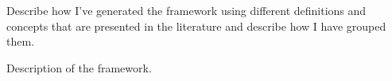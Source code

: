 \begin{table}[htbp]
\begin{tabular}{|p{5cm}|p{9cm}|}
    \bottomrule
    \end{tabular}%
  \label{tab:addlabel}%
\end{table}%



Describe how I’ve generated the framework using different definitions and concepts that are presented in the literature and describe how I have grouped them.

Description of the framework.

